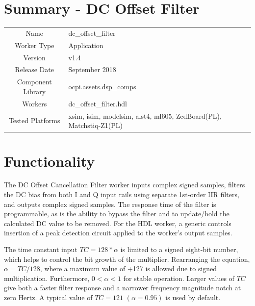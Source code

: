 \documentclass{article}
\author{} %
\date{Version \docVersion} %
\title{\docTitle}
\def\docVersion{1.4}
\def\comp{dc\_offset\_filter}
\def\Comp{DC Offset Filter}
\begin{document}
\section*{Summary - \Comp}
\begin{tabular}{|c|M{13.5cm}|}
	\hline
	                  &                                                    \\
	\hline
	Name              & \comp                                              \\
	\hline
	Worker Type       & Application                                        \\
	\hline
	Version           & v\docVersion \\
	\hline
	Release Date      & September 2018 \\
	\hline
	Component Library & ocpi.assets.dsp\_comps                              \\
	\hline
	Workers           & \comp.hdl                                          \\
	\hline
	Tested Platforms  & xsim, isim, modelsim, alst4, ml605, ZedBoard(PL), Matchstiq-Z1(PL) \\
	\hline
\end{tabular}

\section*{Functionality}
\begin{flushleft}
	The DC Offset Cancellation Filter worker inputs complex signed samples, filters the DC bias from both I and Q input rails using separate 1st-order IIR filters, and outputs complex signed samples. The response time of the filter is programmable, as is the ability to bypass the filter and to update/hold the calculated DC value to be removed. For the HDL worker, a generic controls insertion of a peak detection circuit applied to the worker's output samples.\medskip

	The time constant input $TC = 128*\alpha$ is limited to a signed eight-bit number, which helps to control the bit growth of the multiplier. Rearranging the equation, $\alpha = TC/128$, where a maximum value of +127 is allowed due to signed multiplication. Furthermore, $0<\alpha<1$ for stable operation. Larger values of $TC$ give both a faster filter response and a narrower frequency magnitude notch at zero Hertz. A typical value of $TC = 121$ $(\alpha = 0.95)$ is used by default.
\end{flushleft}
\end{document}
